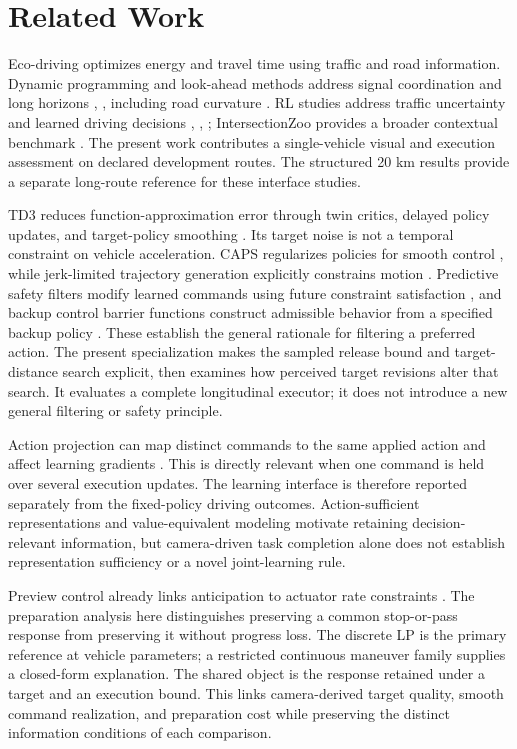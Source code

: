 \documentclass[letterpaper,journal]{IEEEtran}
\begin{document}
\section{Related Work}

Eco-driving optimizes energy and travel time using traffic and road information. Dynamic programming and look-ahead methods address signal coordination and long horizons \cite{R-DP1}, \cite{R-DP2}, including road curvature \cite{R-CURV}. RL studies address traffic uncertainty and learned driving decisions \cite{R-RL1}, \cite{R-RL2}, \cite{R-RL3}; IntersectionZoo provides a broader contextual benchmark \cite{R-IZOO}. The present work contributes a single-vehicle visual and execution assessment on declared development routes. The structured 20 km results provide a separate long-route reference for these interface studies.

TD3 reduces function-approximation error through twin critics, delayed policy updates, and target-policy smoothing \cite{R-TD3}. Its target noise is not a temporal constraint on vehicle acceleration. CAPS regularizes policies for smooth control \cite{R-CAPS}, while jerk-limited trajectory generation explicitly constrains motion \cite{R-RUCKIG}. Predictive safety filters modify learned commands using future constraint satisfaction \cite{R-PSF}, and backup control barrier functions construct admissible behavior from a specified backup policy \cite{R-BCBF}. These establish the general rationale for filtering a preferred action. The present specialization makes the sampled release bound and target-distance search explicit, then examines how perceived target revisions alter that search. It evaluates a complete longitudinal executor; it does not introduce a new general filtering or safety principle.

Action projection can map distinct commands to the same applied action and affect learning gradients \cite{R-PROJ}. This is directly relevant when one command is held over several execution updates. The learning interface is therefore reported separately from the fixed-policy driving outcomes. Action-sufficient representations \cite{R-ASR} and value-equivalent modeling \cite{R-VE} motivate retaining decision-relevant information, but camera-driven task completion alone does not establish representation sufficiency or a novel joint-learning rule.

Preview control already links anticipation to actuator rate constraints \cite{R-PREVIEW}. The preparation analysis here distinguishes preserving a common stop-or-pass response from preserving it without progress loss. The discrete LP is the primary reference at vehicle parameters; a restricted continuous maneuver family supplies a closed-form explanation. The shared object is the response retained under a target and an execution bound. This links camera-derived target quality, smooth command realization, and preparation cost while preserving the distinct information conditions of each comparison.
\end{document}
